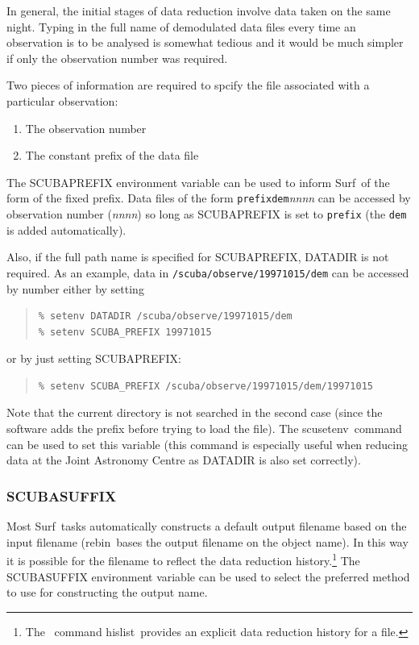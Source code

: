 \documentclass[twoside,11pt]{article}
\newcommand{\scusoft}          {{\sc Surf}}
\newcommand{\Kappa}{\xref{{\sc{Kappa}}}{sun95}{}}
\newcommand{\task}[1]{{\sf #1}}
\newcommand{\rebin}{\htmlref{\task{rebin}}{REBIN}}
\newcommand{\scusetenv}{\htmlref{\task{scusetenv}}{SCUSETENV}}
\newcommand{\hislist}{\xref{\task{hislist}}{sun95}{HISLIST}}
\newenvironment{myquote}{\begin{quote}\begin{small}}{\end{small}\end{quote}}
\newcommand{\htmlref}[2]{#1}
\newcommand{\xref}[3]{#1}
\renewcommand{\_}{\texttt{\symbol{95}}}
\begin{document}
In general, the initial stages of data reduction involve data taken on the
same night. Typing in the full name of demodulated data files every time an
observation is to be analysed is somewhat tedious and it would be much simpler 
if only the observation number was required.

Two pieces of information are required to spcify the file associated with a
particular observation:
\begin{enumerate}
\item The observation number
\item The constant prefix of the data file
\end{enumerate}

The SCUBA\_PREFIX environment variable can be used to inform \scusoft\
of the form of the fixed prefix. Data files of the form
\texttt{prefix\_dem\_}\textit{nnnn} can be accessed by observation number
(\textit{nnnn}) so long as SCUBA\_PREFIX is set to \texttt{prefix} (the
\texttt{\_dem\_} is added automatically).

Also, if the full path name is specified for SCUBA\_PREFIX, DATADIR is not
required. As an example, data in \texttt{/scuba/observe/19971015/dem}
can be accessed by number either by setting
\begin{myquote}
\begin{verbatim}
% setenv DATADIR /scuba/observe/19971015/dem
% setenv SCUBA_PREFIX 19971015
\end{verbatim}
\end{myquote}
or by just setting SCUBA\_PREFIX:
\begin{myquote}
\begin{verbatim}
% setenv SCUBA_PREFIX /scuba/observe/19971015/dem/19971015
\end{verbatim}
\end{myquote}
Note that the current directory is not searched in the second case (since the
software adds the prefix before trying to load the file). The \scusetenv\
command can be used to set this variable (this command is especially useful
when reducing data at the Joint Astronomy Centre as DATADIR is also set
correctly).



\subsubsection{SCUBA\_SUFFIX}

Most \scusoft\ tasks automatically constructs a default output filename based
on the input filename (\rebin\ bases the output filename on the object name).
In this way it is possible for the filename to reflect the data reduction
history.\footnote{The \Kappa\ command \hislist\ provides an explicit data
reduction history for a file.}
The SCUBA\_SUFFIX environment variable can be used to select the preferred 
method to use for constructing the output name.
\end{document}
